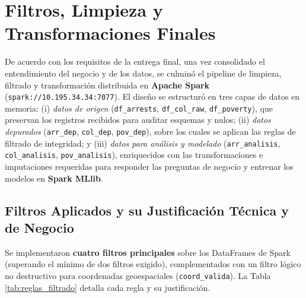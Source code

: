 \section{Filtros, Limpieza y Transformaciones Finales}
\label{sec:limpieza_transformacion}

De acuerdo con los requisitos de la entrega final, una vez consolidado el entendimiento del negocio y de los datos, se culminó el pipeline de limpieza, filtrado y transformación distribuida en \textbf{Apache Spark} (\texttt{spark://10.195.34.34:7077}). El diseño se estructuró en tres capas de datos en memoria: (i) \textit{datos de origen} (\texttt{df\_arrests}, \texttt{df\_col\_raw}, \texttt{df\_poverty}), que preservan los registros recibidos para auditar esquemas y nulos; (ii) \textit{datos depurados} (\texttt{arr\_dep}, \texttt{col\_dep}, \texttt{pov\_dep}), sobre los cuales se aplican las reglas de filtrado de integridad; y (iii) \textit{datos para análisis y modelado} (\texttt{arr\_analisis}, \texttt{col\_analisis}, \texttt{pov\_analisis}), enriquecidos con las transformaciones e imputaciones requeridas para responder las preguntas de negocio y entrenar los modelos en \textbf{Spark MLlib}.

\subsection{Filtros Aplicados y su Justificación Técnica y de Negocio}
\label{subsec:filtros_inconsistentes}

Se implementaron \textbf{cuatro filtros principales} sobre los DataFrames de Spark (superando el mínimo de dos filtros exigido), complementados con un filtro lógico no destructivo para coordenadas geoespaciales (\texttt{coord\_valida}). La Tabla \ref{tab:reglas_filtrado} detalla cada regla y su justificación.

